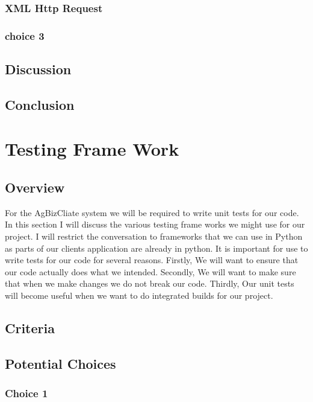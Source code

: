 \documentclass[letterpaper,10pt]{article}
\begin{document}
		\subsubsection{XML Http Request}
		
		\subsubsection{choice 3}
		
	\subsection{Discussion}
	
	\subsection{Conclusion}
	
	
\section{Testing Frame Work}
		\subsection{Overview}
						For the AgBizCliate system we will be required to write unit tests for our code. In this section I will discuss the various testing frame works we might use for our project. I will restrict the conversation to frameworks that we can use in Python as parts of our clients application are already in python. It is important for use to write tests for our code for several reasons. Firstly, We will want to ensure that our code actually does what we intended. Secondly, We will want to make sure that when we make changes we do not break our code. Thirdly, Our unit tests will become useful when we want to do integrated builds for our project.\\

	
	\subsection{Criteria}
	
	\subsection{Potential Choices}
		\subsubsection{Choice 1}
		
\end{document}

